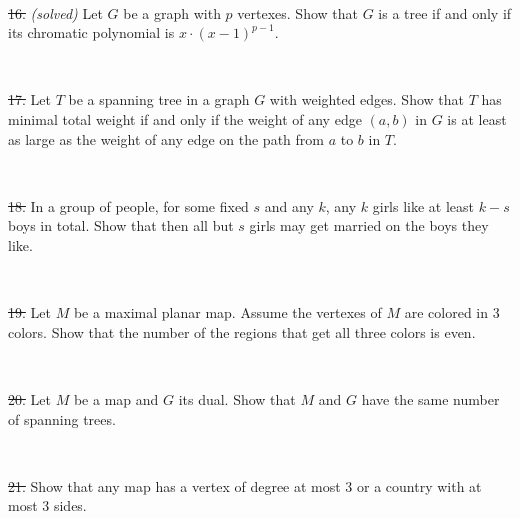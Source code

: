 \documentclass[oneside,a4paper]{article}
\begin{document}
\ 

\noindent \sout{16.} \textit{(solved)}
Let $G$ be a graph with $p$ vertexes.
Show that  $G$ is a tree if and only if
its chromatic polynomial is $x\cdot(x-1)^{p-1}$.

\ 

\noindent \sout{17.} Let $T$ be a spanning tree in a graph $G$ with weighted edges.
Show that $T$ has minimal total weight if and only if the weight of any edge $(a,b)$ in $G$ is at least as large as the weight of any edge on the path from $a$ to $b$ in $T$. 


\ 

\noindent \sout{18.} In a group of people, for some fixed $s$ and any $k$,
any $k$ girls like at least $k-s$ boys in total.
Show that then all but $s$ girls may get married on the boys they like.

\ 

\noindent \sout{19.} %
Let $M$ be a maximal planar map.
Assume the vertexes of $M$ are colored in 3 colors.
Show that the number of the regions that get all three colors is even.

\ 

\noindent \sout{20.}
Let $M$ be a map and $G$ its dual.
Show that $M$ and $G$ have the same number of spanning trees.

\ 

\noindent %
\sout{21.} %
Show that any map has a vertex of degree at most 3 or a country with at most 3 sides.
\end{document}
